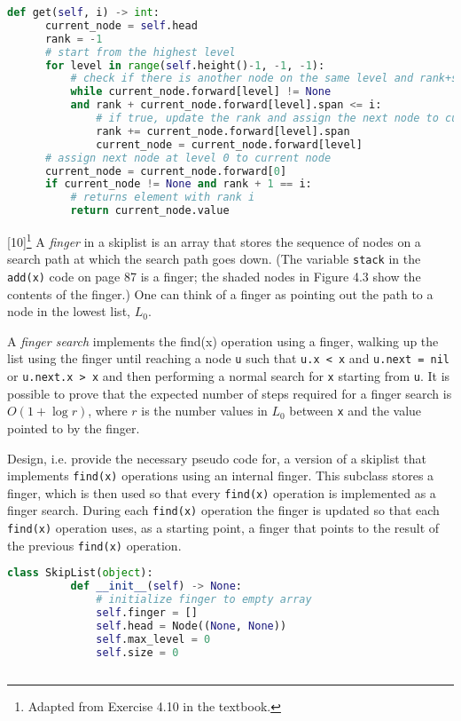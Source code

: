 \documentclass[addpoints]{exam}
\begin{document}
\begin{questions}
\begin{solution}
\begin{lstlisting}[language=Python]
    def get(self, i) -> int:
      current_node = self.head
      rank = -1
      # start from the highest level
      for level in range(self.height()-1, -1, -1):
          # check if there is another node on the same level and rank+span < i           
          while current_node.forward[level] != None         
          and rank + current_node.forward[level].span <= i: 
              # if true, update the rank and assign the next node to current node
              rank += current_node.forward[level].span        
              current_node = current_node.forward[level]     
      # assign next node at level 0 to current node
      current_node = current_node.forward[0]                  
      if current_node != None and rank + 1 == i:
          # returns element with rank i
          return current_node.value                           
      \end{lstlisting}
  \end{solution}

  [10]\footnote{Adapted from Exercise 4.10 in the textbook.}
  A \textit{finger} in a skiplist is an array that stores the sequence of nodes on a search path at which the search path goes down. (The variable \texttt{stack} in the \texttt{add(x)} code on page 87 is a finger; the shaded nodes in Figure 4.3 show the contents of the finger.) One can think of a finger as pointing out the path to a node in the lowest list, $L_0$.

  A \textit{finger search} implements the find(x) operation using a finger, walking up the list using the finger until reaching a node \texttt{u} such that \texttt{u.x < x} and \texttt{u.next = nil} or \texttt{u.next.x > x} and then performing a normal search for \texttt{x} starting from \texttt{u}. It is possible to prove that the expected number of steps required for a finger search is $O(1+\log r)$, where $r$ is the number values in $L_0$ between \texttt{x} and the value pointed to by the finger.

  Design, i.e. provide the necessary pseudo code for, a version of a skiplist that implements \texttt{find(x)} operations using an internal finger. This subclass stores a finger, which is then used so that every \texttt{find(x)} operation is implemented as a finger search. During each \texttt{find(x)} operation the finger is updated so that each \texttt{find(x)} operation uses, as a starting point, a finger that points to the result of the previous \texttt{find(x)} operation.
  \begin{solution}
    \begin{lstlisting}[language=Python]
      class SkipList(object):
          def __init__(self) -> None:
              # initialize finger to empty array
              self.finger = []       
              self.head = Node((None, None))
              self.max_level = 0
              self.size = 0
      

\end{lstlisting}
\end{solution}
\end{questions}
\end{document}
